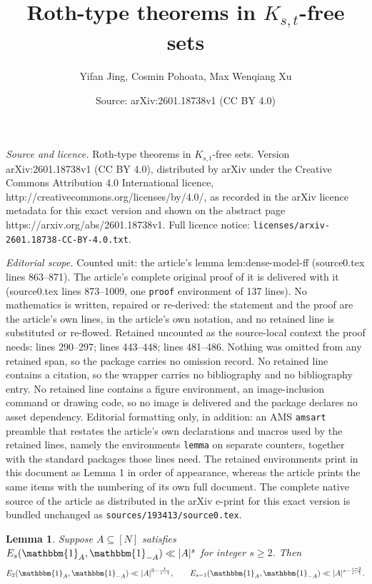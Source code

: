 \documentclass[10pt,a4paper]{amsart}
\title{\vspace{-0.7cm} Roth-type theorems in $K_{s,t}$-free sets}
\author{Yifan Jing, Cosmin Pohoata, Max Wenqiang Xu}
\date{Source: arXiv:2601.18738v1 (CC BY 4.0)}
\newtheorem{lemma}{Lemma}
\newcommand{\e}{\mathbbm{1}}          %
\begin{document}
\maketitle

\noindent\emph{Source and licence.} \vspace{-0.7cm} Roth-type theorems in $K_{s,t}$-free sets. Version arXiv:2601.18738v1 (CC BY 4.0), distributed by arXiv under the Creative Commons Attribution 4.0 International licence, http://creativecommons.org/licenses/by/4.0/, as recorded in the arXiv licence metadata for this exact version and shown on the abstract page https://arxiv.org/abs/2601.18738v1. Full licence notice: \texttt{licenses/arxiv-2601.18738-CC-BY-4.0.txt}.\par\smallskip

\noindent\textit{Editorial scope.} Counted unit: the article's lemma lem:dense-model-ff (source0.tex lines 863--871). The article's complete original proof of it is delivered with it (source0.tex lines 873--1009, one \texttt{proof} environment of 137 lines). No mathematics is written, repaired or re-derived: the statement and the proof are the article's own lines, in the article's own notation, and no retained line is substituted or re-flowed.  Retained uncounted as the source-local context the proof needs: lines 290--297; lines 443--448; lines 481--486.  Nothing was omitted from any retained span, so the package carries no omission record.  No retained line contains a citation, so the wrapper carries no bibliography and no bibliography entry.  No retained line contains a figure environment, an image-inclusion command or drawing code, so no image is delivered and the package declares no asset dependency.  Editorial formatting only, in addition: an AMS \texttt{amsart} preamble that restates the article's own declarations and macros used by the retained lines, namely the environments \texttt{lemma} on separate counters, together with the standard packages those lines need.  The retained environments print in this document as Lemma 1 in order of appearance, whereas the article prints the same items with the numbering of its own full document.  The complete native source of the article as distributed in the arXiv e-print for this exact version is bundled unchanged as \texttt{sources/193413/source0.tex}.
\begin{lemma}\label{lem: E2}
Suppose $A\subseteq [N]$ satisfies $E_s(\e_A,\e_{-A})\ll |A|^s$ for integer  $s\ge 2$. Then
\[
E_{2}(\e_A,\e_{-A})\ll |A|^{3-\frac{1}{s-1}},
\qquad
E_{s-1}(\e_A,\e_{-A})\ll |A|^{s-\frac{s-2}{s-1}}.
\]
\end{lemma}
\end{document}
